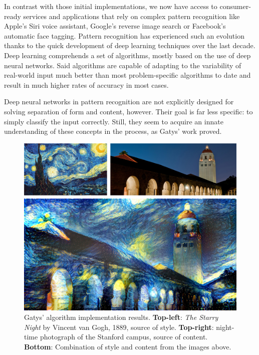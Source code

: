In contrast with those initial implementations, we now have access to consumer-ready services and applications that rely on complex pattern recognition like Apple's Siri voice assistant, Google's reverse image search or Facebook's automatic face tagging.
Pattern recognition has experienced such an evolution thanks to the quick development of deep learning techniques over the last decade.
Deep learning comprehends a set of algorithms, mostly based on the use of deep neural networks.
Said algorithms are capable of adapting to the variability of real-world input much better than most problem-specific algorithms to date and result in much higher rates of accuracy in most cases.

Deep neural networks in pattern recognition are not explicitly designed for solving separation of form and content, however.
Their goal is far less specific: to simply classify the input correctly.
Still, they seem to acquire an innate understanding of these concepts in the process, as Gatys' work \cite{Gatys2015B} proved.

\begin{figure}[htb]
  \includegraphics[width=\textwidth]{gfx/neural-style-composed}
  \caption{Gatys' algorithm implementation \cite{Johnson2015} results. \textbf{Top-left}: \textit{The Starry Night} by Vincent van Gogh, 1889, source of style. \textbf{Top-right}: night-time photograph of the Stanford campus, source of content. \textbf{Bottom}: Combination of style and content from the images above.}
  \label{fig:sec:intro:neural-style}
\end{figure}

